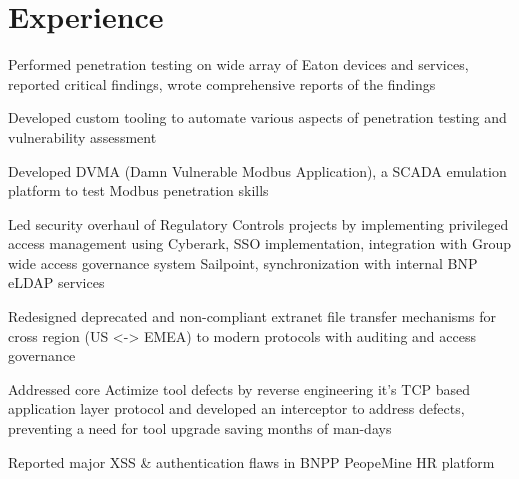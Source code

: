 \documentclass[letterpaper]{deedy-resume} %
\begin{document}
\begin{minipage}[t]{0.66\textwidth} %


\section{Experience}


\vspace{\topsep} %
\begin{tightitemize}
\item  Performed penetration testing on wide array of Eaton devices and services, reported critical findings, wrote comprehensive reports of the findings
\item  Developed custom tooling to automate various aspects of penetration testing and vulnerability assessment
\item  Developed DVMA (Damn Vulnerable Modbus Application), a SCADA emulation platform to test Modbus penetration skills
\end{tightitemize}

\sectionspace %




\begin{tightitemize}
\item Led security overhaul of Regulatory Controls projects by implementing privileged access management using Cyberark, SSO implementation, integration with Group wide access governance system Sailpoint, synchronization with internal BNP eLDAP services
\item Redesigned deprecated and non-compliant extranet file transfer mechanisms for cross region (US <-> EMEA) to modern protocols with auditing and access governance
\item  Addressed core Actimize tool defects by reverse engineering it's TCP based application layer protocol and developed an interceptor to address defects, preventing a need for tool upgrade saving months of man-days
\item  Reported major XSS \& authentication flaws in BNPP PeopeMine HR platform
\end{tightitemize}


\end{minipage}
\end{document}
